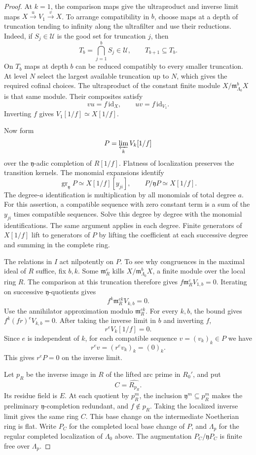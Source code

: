 \begin{proof}
At \(k=1\), the comparison maps give the ultraproduct and inverse
limit maps
\(X \xrightarrow{u} V_1\xrightarrow{v} X\).
To arrange compatibility in \(b\), choose maps at a depth
of truncation tending to infinity along the ultrafilter
and use their reductions. Indeed, if \(S_j\in\mathcal U\) is the good set for truncation \(j\), then
\[
 T_b=\bigcap_{j=1}^b S_j\in\mathcal U,\qquad T_{b+1}\subseteq T_b .
\]
On \(T_b\) maps at depth \(b\) can be reduced compatibly to every smaller truncation. At level \(N\) select the largest
available truncation up to \(N\), which gives the
required cofinal choices. The
ultraproduct of the constant finite module
\(X/\mathfrak m_{\Lambda_0}^bX\) is that same module.
Their composites satisfy
\[
      vu=f\,\mathrm{id}_X,\qquad uv=f\,\mathrm{id}_{V_1}.
\]
Inverting \(f\) gives \(V_1[1/f]\simeq X[1/f]\).

Now form
\[
 P=\varprojlim_k V_k[1/f]
\]
over the \(\mathfrak y\)-adic completion of \(R[1/f]\).
Flatness of localization preserves the transition kernels. The
monomial expansions identify
\[
   \operatorname{gr}_{\mathfrak y}P\simeq X[1/f][y_{ji}],
           \qquad P/\mathfrak yP\simeq X[1/f].
\]
The degree-\(a\) identification is multiplication by all monomials
of total degree \(a\).
For this assertion, a compatible sequence with zero
constant term is a sum of the \(y_{ji}\) times compatible
sequences. Solve this degree by degree with the
monomial identifications. The same argument applies in
each degree. Finite generators of \(X[1/f]\) lift to
generators of \(P\) by lifting the coefficient at each
successive degree and summing in the complete ring.

The relations in \(I\) act nilpotently on \(P\). To see
why congruences in the maximal ideal of \(R\) suffice,
fix \(b,k\). Some \(\mathfrak m_R^c\) kills
\(X/\mathfrak m_{\Lambda_0}^b X\), a finite module over
the local ring \(R\). The comparison at this truncation
therefore gives \(f\mathfrak m_R^cV_{1,b}=0\).
Iterating on successive \(\mathfrak y\)-quotients gives
\[
 f^k\mathfrak m_R^{ck}V_{k,b}=0.
\]
Use the annihilator approximation modulo
\(\mathfrak m_R^{ck}\). For every \(k,b\), the bound gives \(f^k(fr)^eV_{k,b}=0\).
After taking the inverse limit in \(b\) and inverting \(f\),
\[
             r^e V_k[1/f]=0 .
\]
Since \(e\) is independent of \(k\), for each compatible sequence \(v=(v_k)_k\in P\) we have
\[
 r^e v=(r^ev_k)_k=(0)_k.
\]
This gives \(r^e P=0\) on the inverse limit.

Let \(p_R\) be the inverse image in \(R\) of the lifted
arc prime in \(R_0'\), and put
\[
 C=\widehat{R_{p_R}}.
\]
Its residue field is \(E\). At each quotient by \(p_R^m\), the
inclusion \(\mathfrak y^m\subseteq p_R^m\) makes the preliminary
\(\mathfrak y\)-completion redundant, and \(f\notin p_R\).
Taking the localized inverse limit gives the same ring \(C\).
This base change on the intermediate Noetherian ring is
flat. Write \(P_C\) for the completed local base change
of \(P\), and \(\Lambda_p\) for the regular completed
localization of \(\Lambda_0\) above. The augmentation
\(P_C/\mathfrak y P_C\) is finite free over
\(\Lambda_p\).


\end{proof}

